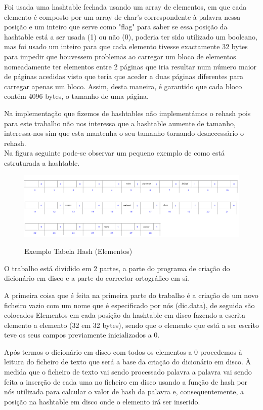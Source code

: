 Foi usada uma hashtable fechada usando um array de elementos, em que cada elemento é composto por um array de char's correspondente à palavra nessa posição e um inteiro que serve como "flag" para saber se essa posição da hashtable está a ser usada (1) ou não (0), poderia ter sido utilizado um booleano, mas foi usado um inteiro para que cada elemento tivesse exactamente 32 bytes para impedir que houvessem problemas ao carregar um bloco de elementos nomeadamente ter elementos entre 2 páginas que iria resultar num número maior de páginas acedidas visto que teria que aceder a duas páginas diferentes para carregar apenas um bloco. Assim, desta maneira, é garantido que cada bloco contém 4096 bytes, o tamanho de uma página. 

Na implementação que fizemos de hashtables não implementámos o rehash pois para este trabalho não nos interessa que a hashtable aumente de tamanho, interessa-nos sim que esta mantenha o seu tamanho tornando desnecessário o rehash.\\

Na figura seguinte pode-se observar um pequeno exemplo de como está estruturada a hashtable.

\begin{figure}[ht]
\centering
\includegraphics[scale=0.45]{hashTable.jpg}\\[1cm]
\caption{Exemplo Tabela Hash (Elementos)}
\label{fig:minipage1}
\end{figure}

O trabalho está dividido em 2 partes, a parte do programa de criação do dicionário em disco e a parte do corrector ortográfico em si.

A primeira coisa que é feita na primeira parte do trabalho é a criação de um novo ficheiro vazio com um nome que é especificado por nós (dic.data), de seguida são colocados Elementos em cada posição da hashtable em disco fazendo a escrita elemento a elemento (32 em 32 bytes), sendo que o elemento que está a ser escrito teve os seus campos previamente inicializados a 0.	

Após termos o dicionário em disco com todos os elementos a 0 procedemos à leitura do ficheiro de texto que será a base da criação do dicionário em disco. À medida que o ficheiro de texto vai sendo processado palavra a palavra vai sendo feita a inserção de cada uma no ficheiro em disco usando a função de hash por nós utilizada para calcular o valor de hash da palavra e, consequentemente, a posição na hashtable em disco onde o elemento irá ser inserido. 

